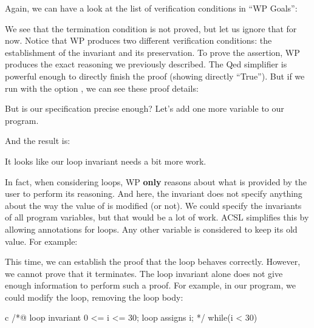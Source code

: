 Again, we can have a look at the list of verification conditions in
``WP Goals'':




We see that the termination condition is not proved, but let us ignore that
for now. Notice that WP produces two different verification conditions: the
establishment of the invariant and its preservation. To prove the
assertion, WP produces the exact
reasoning we previously described. The Qed simplifier is
powerful enough to directly finish the proof (showing directly ``True''). 
But if we run with the option , we can see
these proof details:




But is our specification precise enough?
Let's add one more variable to our program.





And the result is:




It looks like our loop invariant needs a bit more work.





In fact, when considering loops, WP \textbf{only} reasons about what is
provided by the user to perform its reasoning. And here, the invariant
does not specify anything about the way the value of  is
modified (or not). We could specify the invariants of all program
variables, but that would be a lot of work. ACSL simplifies this by allowing
 annotations for loops. Any other variable is considered
to keep its old value. For example:






This time, we can establish the proof that the loop behaves correctly.
However, we cannot prove that it terminates. The loop invariant alone
does not give enough information to perform such a proof. For example,
in our program, we could modify the loop, removing the loop body:



\begin{CodeBlock}{c}
/*@
  loop invariant 0 <= i <= 30;
  loop assigns i;
*/
while(i < 30){

}
\end{CodeBlock}



